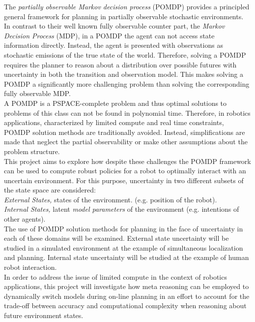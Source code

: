 The \textit{partially observable Markov decision process} (POMDP) provides
a principled general framework for planning in partially observable stochastic
environments. In contrast to their well known fully observable counter part,
the \textit{Markov Decision Process} (MDP), in a POMDP the agent can not access
state information directly. Instead, the agent is presented with observations
as stochastic emissions of the true state of the world. Therefore, solving
a POMDP requires the planner to reason about a distribution over possible
futures with uncertainty in both the transition and observation model. This
makes solving a POMDP a significantly more challenging problem than solving the
corresponding fully observable MDP.\\

A POMDP is a PSPACE-complete problem and thus optimal solutions to problems of
this class can not be found in polynomial time. Therefore, in robotics
applications, characterized by limited compute and real time constraints, POMDP
solution methods are traditionally avoided. Instead, simplifications are made
that neglect the partial observability or make other assumptions about the
problem structure.\\

This project aims to explore how despite these challenges the POMDP
framework can be used to compute robust policies for a robot to optimally
interact with an uncertain environment. For this purpose, uncertainty in
two different subsets of the state space are considered:\\
\textit{External States,}  states of the environment. (e.g. position of the
robot).\\
\textit{Internal States,} latent \textit{model parameters} of the
environment (e.g. intentions of other agents).\\

The use of POMDP solution methods for planning in the face of uncertainty in
each of these domains will be examined. External state uncertainty will be
studied in a simulated environment at the example of simultaneous localization
and planning. Internal state uncertainty will be studied at the example of
human robot interaction.\\
In order to address the issue of limited compute in the context of robotics
applications, this project will investigate how meta reasoning can be employed to
dynamically switch models during on-line planning in an effort to account for
the trade-off between accuracy and computational complexity when reasoning about
future environment states.
